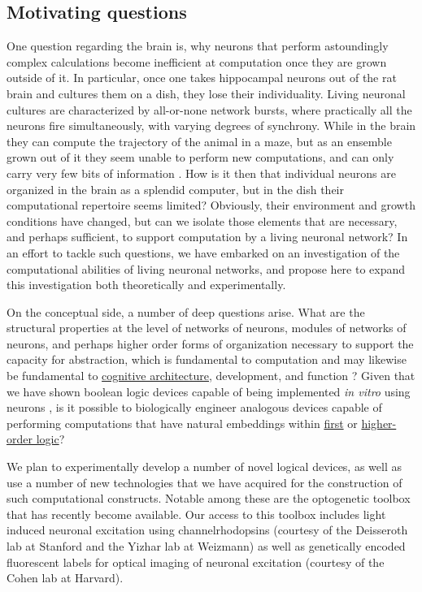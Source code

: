 \subsection{Motivating questions}
One question regarding the brain is, why neurons that perform astoundingly complex calculations become inefficient at computation once they are grown outside of it. In particular, once one takes hippocampal neurons out of the rat brain and cultures them on a dish, they lose their individuality. Living neuronal cultures are characterized by all-or-none network bursts, where practically all the neurons fire simultaneously, with varying degrees of synchrony. While in the brain they can compute the trajectory of the animal in a maze, but as an ensemble grown out of it they seem unable to perform new computations, and can only carry very few bits of information \cite{Feinerman2006}. How is it then that individual neurons are organized in the brain as a splendid computer, but in the dish their computational repertoire seems limited? Obviously, their environment and growth conditions have changed, but can we isolate those elements that are necessary, and perhaps sufficient, to support computation by a living neuronal network? In an effort to tackle such questions, we have embarked on an investigation of the computational abilities of living neuronal networks, and propose here to expand this investigation both theoretically and experimentally.

On the conceptual side, a number of deep questions arise. What are the structural properties at the level of networks of neurons,
modules of networks of neurons, and perhaps higher order forms of
organization necessary to support the capacity for
abstraction, which is fundamental to computation \cite{Abelson1996} and may likewise be fundamental to
\href{http://en.wikipedia.org/wiki/Cognitive\_architecture}{cognitive
architecture}, development, and function \cite{Tenenbaum2011}? Given that we have shown boolean
logic devices capable of being implemented {\em in vitro} using
neurons \cite{Feinerman2008}, is it possible to biologically engineer analogous
devices capable of performing computations that have natural embeddings
within \href{http://en.wikipedia.org/wiki/First-order\_logic}{first} or
\href{http://en.wikipedia.org/wiki/Higher\_order\_logic}{higher-order
logic}?

We plan to experimentally develop a number of novel logical devices, as well as use a number of new technologies that we have acquired for the construction of such computational constructs. Notable among these are the optogenetic toolbox that has recently become available. Our access to this toolbox includes light induced neuronal excitation using channelrhodopsins (courtesy of the Deisseroth lab at Stanford and the Yizhar lab at Weizmann) as well as genetically encoded fluorescent labels for optical imaging of neuronal excitation (courtesy of the Cohen lab at Harvard).

